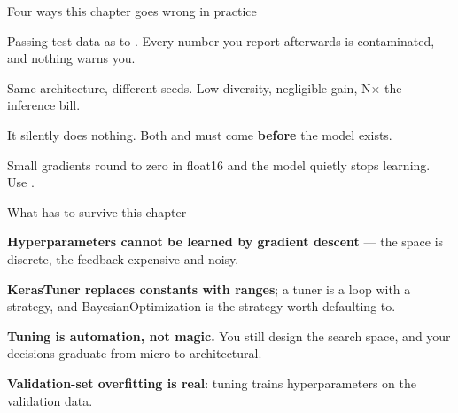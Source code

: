 \documentclass[aspectratio=169,11pt,t]{beamer}
\begin{document}
\begin{frame}[shrink=25]{Four ways this chapter goes wrong in practice}
\begin{minipage}[t]{0.494\textwidth}
\begin{icardbad}
Passing test data as  to . Every number you report afterwards is contaminated, and nothing warns you.
\end{icardbad}
\end{minipage}%
\hfill
\begin{minipage}[t]{0.494\textwidth}
\begin{icardbad}
Same architecture, different seeds. Low diversity, negligible gain, N$\times$ the inference bill.
\end{icardbad}
\end{minipage}%


\vskip 4pt

\begin{minipage}[t]{0.494\textwidth}
\begin{icardwarn}
It silently does nothing. Both  and  must come \textbf{before} the model exists.
\end{icardwarn}
\end{minipage}%
\hfill
\begin{minipage}[t]{0.494\textwidth}
\begin{icardwarn}
Small gradients round to zero in float16 and the model quietly stops learning. Use .
\end{icardwarn}
\end{minipage}%
\end{frame}

\begin{frame}[shrink=25]{What has to survive this chapter}
\begin{isteps}
\item \textbf{Hyperparameters cannot be learned by gradient descent} --- the space is discrete, the feedback expensive and noisy.
\item \textbf{KerasTuner replaces constants with ranges}; a tuner is a loop with a strategy, and BayesianOptimization is the strategy worth defaulting to.
\item \textbf{Tuning is automation, not magic.} You still design the search space, and your decisions graduate from micro to architectural.
\item \textbf{Validation-set overfitting is real}: tuning trains hyperparameters on the validation data.
\end{isteps}
\end{frame}
\end{document}
